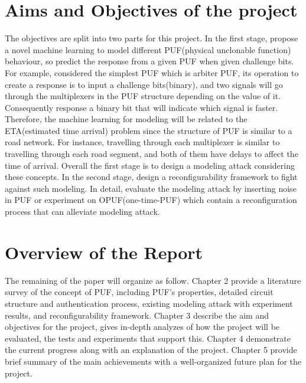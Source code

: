 \section{Aims and Objectives of the project}
The objectives are split into two parts for this project. In the first stage, propose a novel machine learning to model different PUF(physical unclonable function)
behaviour, so predict the response from a given PUF when given challenge bits. For example, considered the simplest PUF which is arbiter PUF, its operation to create a response is to
input a challenge bits(binary), and two signals will go through the multiplexers in the PUF structure depending on the value of it. Consequently response a binary bit
that will indicate which signal is faster. Therefore, the machine learning for modeling will be related to the ETA(estimated time arrival) problem since the structure of PUF is similar to a road network. 
For instance, travelling through each multiplexer is similar to travelling through each road segment, and both of them have delays to affect the time of arrival. Overall the first stage is to design a modeling attack
considering these concepts. In the second stage, design a reconfigurability framework to fight against such modeling. In detail, evaluate the modeling attack by inserting noise in PUF or experiment on OPUF(one-time-PUF) which
contain a reconfiguration process that can alleviate modeling attack.

\section{Overview of the Report}
The remaining of the paper will organize as follow. Chapter 2 provide a literature survey of the concept of PUF, including PUF's properties, detailed circuit structure and authentication process, 
existing modeling attack with experiment results, and reconfigurability framework. Chapter 3 describe the aim and objectives for the project, gives in-depth analyzes of how the project will be evaluated, 
the tests and experiments that support this. Chapter 4 demonstrate the current progress along with an explanation of the project. Chapter 5 provide brief summary of the main achievements with a well-organized future plan for the project.
